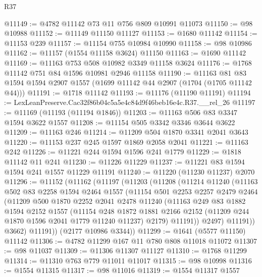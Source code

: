 \begin{lexlean}{R37}
\begin{coremodule}
@11149 := @4782 @11142 @73 @11 @756 @809 @10991 @11073
@11150 := @98 @10988
@11152 := @11149 @11150 @11127
@11153 := @1680 @11142
@11154 := @11153 @239
@11157 := @11154 @755 @10984 @10990
@11158 := @98 @10986
@11162 := @11157 (@1554 @11158 @3624) @11150
@11163 := @1690 @11142
@11169 := @11163 @753 @508 @10982 @3349 @11158 @3624
@11176 := @1768 @11142 @751 @84 @1596 @10981 @2946 @11158
@11190 := @11163 @81 @83 @1594 @1594 @2907 @1557 (@1699 @11142 @44 @2907 (@1704 (@1705 @11142 @44)))
@11191 := @1718 @11142
@11193 := @11176 (@11190 @11191)
@11194 := LexLeanPreserve.Cac32f86b04c5a5e4c84d9f46beb16e4c.R37.__rel_26
@11197 := @11169 (@11193 (@11194 @1846))
@11203 := @11163 @506 @83 @3347 @1594 @3622 @1557
@11208 := @11154 @505 @3342 @3346 @3644 @3622
@11209 := @11163 @246
@11214 := @11209 @504 @1870 @3341 @2041 @3643
@11220 := @11153 @237 @245 @1597 @1869 @2058 @2041
@11221 := @11163 @242
@11226 := @11221 @244 @1594 @1596 @241 @1779
@11229 := @1818 @11142 @11 @241
@11230 := @11226 @11229
@11237 := @11221 @83 @1594 @1594 @241 @1557 @11229 @11191
@11240 := @11220 (@11230 @11237) @2070
@11296 := @11152
    (@11162
      (@11197
        (@11203
          (@11208
            (@11214
              @11240
              (@11163
                @502
                @83
                @2258
                @1594
                @2464
                @1557
                (@11154
                  @501
                  @2253
                  @2257
                  @2479
                  @2464
                  (@11209
                    @500
                    @1870
                    @2252
                    @2041
                    @2478
                    @11240
                    (@11163
                      @249
                      @83
                      @1882
                      @1594
                      @2152
                      @1557
                      (@11154
                        @248
                        @1872
                        @1881
                        @2166
                        @2152
                        (@11209 @244 @1870 @1596 @2041 @1779 @11240 @11237)
                        @2179)
                      @11191))
                  @2497)
                @11191))
            @3662)
          @11191))
      (@2177 @10986 @3344))
@11299 := @1641 (@5577 @11150) @11142
@11306 := @4782 @11299 @167 @11 @780 @808 @11018 @11072
@11307 := @98 @11037
@11309 := @11306 @11307 @11127
@11310 := @1768 @11299
@11314 := @11310 @763 @779 @11011 @11017
@11315 := @98 @10998
@11316 := @1554 @11315
@11317 := @98 @11016
@11319 := @1554 @11317 @1557

\end{coremodule}
\end{lexlean}
